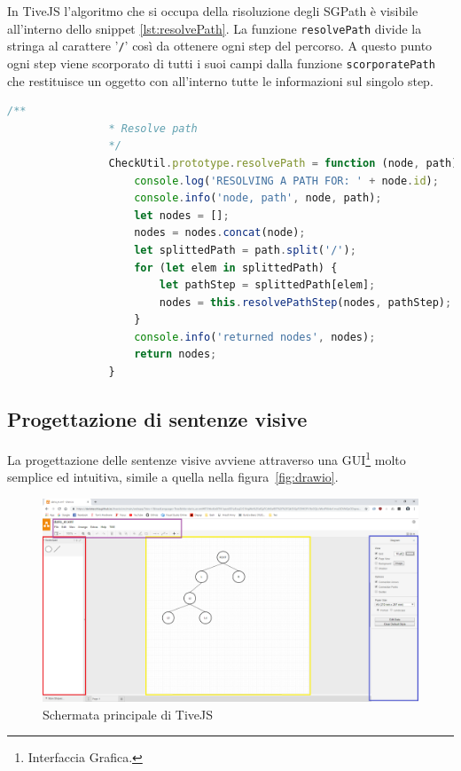             In TiveJS l'algoritmo che si occupa della risoluzione degli SGPath è visibile all'interno dello snippet \ref{lst:resolvePath}. La funzione \texttt{resolvePath} divide la stringa al carattere '\texttt{/}' così da ottenere ogni step del percorso. A questo punto ogni step viene scorporato di tutti i suoi campi dalla funzione \texttt{scorporatePath} che restituisce un oggetto con all'interno tutte le informazioni sul singolo step.
            \begin{lstlisting}[language=JavaScript,caption=\textbf{Funzione che si occupa della risoluzione delle path},label={lst:resolvePath}]
                /**
                * Resolve path
                */
                CheckUtil.prototype.resolvePath = function (node, path) {
                    console.log('RESOLVING A PATH FOR: ' + node.id);
                    console.info('node, path', node, path);
                    let nodes = [];
                    nodes = nodes.concat(node);
                    let splittedPath = path.split('/');
                    for (let elem in splittedPath) {
                        let pathStep = splittedPath[elem];
                        nodes = this.resolvePathStep(nodes, pathStep);
                    }
                    console.info('returned nodes', nodes);
                    return nodes;
                }
            \end{lstlisting}
        
        \subsection{Progettazione di sentenze visive}
            La progettazione delle sentenze visive avviene attraverso una GUI\footnote{Interfaccia Grafica.} molto semplice ed intuitiva, simile a quella nella figura~\ref{fig:drawio}.

            \begin{figure}[htbp]
                \centering
                \includegraphics[scale=0.25]{Figure/tivejs_gui2.png}
                \caption{Schermata principale di TiveJS}
                \label{fig:tivejsgui}
            \end{figure}

